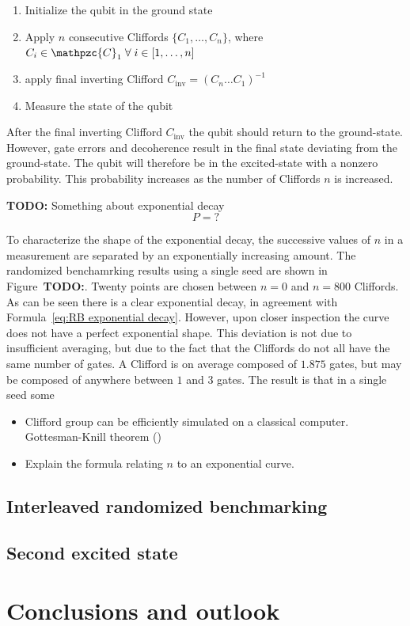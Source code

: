       \begin{enumerate}
        \item Initialize the qubit in the ground state
        \item Apply $n$ consecutive Cliffords $\{C_1, \dots, C_n\}$, where $C_i \in \mathpzc{C}_1 \; \forall \; i \in \left[1, \dots, n\right]$
        \item apply final inverting Clifford $C_\text{inv}=\left( C_n \dots C_1 \right)^{-1}$
        \item Measure the state of the qubit
      \end{enumerate}

      After the final inverting Clifford $C_\text{inv}$ the qubit should return to the ground-state. However, gate errors and decoherence result in the final state deviating from the ground-state. The qubit will therefore be in the excited-state with a nonzero probability. This probability increases as the number of Cliffords $n$ is increased.

      \textbf{TODO:} Something about exponential decay
      \begin{equation}
        P=?
        \label{eq:RB exponential decay}
      \end{equation}

      To characterize the shape of the exponential decay, the successive values of $n$ in a measurement are separated by an exponentially increasing amount. The randomized benchamrking results using a single seed are shown in Figure~\textbf{TODO:}. Twenty points are chosen between $n=0$ and $n=800$ Cliffords. As can be seen there is a clear exponential decay, in agreement with Formula~\ref{eq:RB exponential decay}. However, upon closer inspection the curve does not have a perfect exponential shape. This deviation is not due to insufficient averaging, but due to the fact that the Cliffords do not all have the same number of gates. A Clifford is on average composed of $1.875$ gates, but may be composed of anywhere between $1$ and $3$ gates. The result is that in a single seed some

      \begin{itemize}
        \item Clifford group can be efficiently simulated on a classical computer. Gottesman-Knill theorem (\cite{gottesman1998heisenberg})
        \item Explain the formula relating $n$ to an exponential curve.
      \end{itemize}

    \section{Interleaved randomized benchmarking}
      \label{sec:interleaved randomized benchmarking}

    \section{Second excited state}

  \chapter{Conclusions and outlook}
